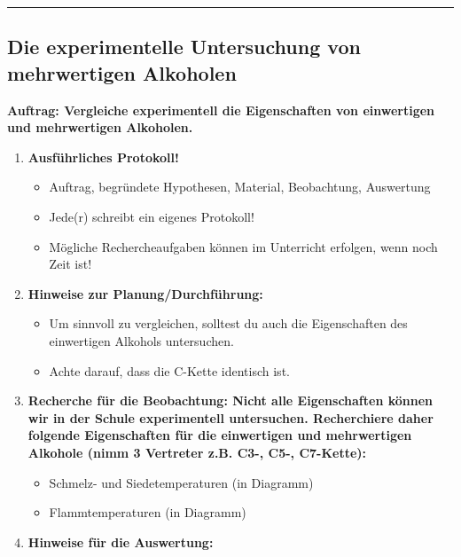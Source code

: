 \documentclass{scrartcl}  %
\begin{document}
			\begin{center}
				\noindent\rule{18cm}{0.1pt}
			\end{center}
						
\newpage
			\subsection{Die experimentelle Untersuchung von mehrwertigen Alkoholen}
			
				\noindent \textbf{Auftrag: Vergleiche experimentell die Eigenschaften von einwertigen und mehrwertigen Alkoholen.}
				\begin{enumerate}
	            \item \textbf{Ausführliches Protokoll!}
	            	\begin{itemize}
	            		\item Auftrag, begründete Hypothesen, Material, Beobachtung, Auswertung
	                	\item Jede(r) schreibt ein eigenes Protokoll!
	                	\item Mögliche Rechercheaufgaben können im Unterricht erfolgen, wenn noch Zeit ist!
					\end{itemize}	            
	            \item \textbf{Hinweise zur Planung/Durchführung:}
	                \begin{itemize}
	                	\item Um sinnvoll zu vergleichen, solltest du auch die Eigenschaften des einwertigen Alkohols untersuchen.
	                	\item Achte darauf, dass die C-Kette identisch ist.
					\end{itemize}	            
	            \item  \textbf{Recherche für die Beobachtung: Nicht alle Eigenschaften können wir in der Schule experimentell untersuchen. Recherchiere daher folgende Eigenschaften für die einwertigen und mehrwertigen Alkohole (nimm 3 Vertreter z.B. C3-, C5-, C7-Kette):}
	                \begin{itemize}
	                	\item Schmelz- und Siedetemperaturen (in Diagramm)
	                	\item Flammtemperaturen (in Diagramm)
	                \end{itemize}
	            \item \textbf{Hinweise für die Auswertung:}
	            	\begin{itemize}

\end{itemize}
\end{enumerate}
\end{document}
